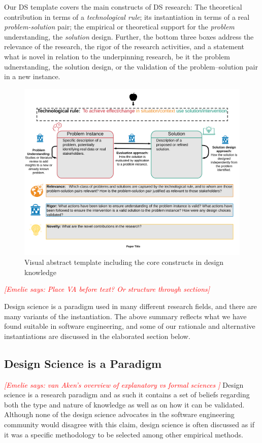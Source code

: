 \documentclass[graybox]{svmult}
\newcommand{\emelie}[1]{\textcolor{red}{{\it [Emelie says: #1]}}}
\newcommand{\emelie}[1]{}
\begin{document}
Our DS template covers the main constructs of DS research: The theoretical contribution in terms of a \emph{technological rule}; its instantiation in terms of a real \emph{problem-solution} pair;  the empirical or theoretical support for the \emph{problem} understanding, the \emph{solution} design. Further, the bottom three boxes address the relevance of the research, the rigor of the research activities, and a statement what is novel in relation to the underpinning research, be it the problem udnerstanding, the solution design, or the validation of the problem--solution pair in a new instance.
\begin{figure}
  \includegraphics[width=1.0\textwidth]{Figures/GenericVA.png}
\caption{Visual abstract template including the core constructs in design knowledge}
\label{fig:VA-template}       %
\end{figure}

\emelie{Place VA before text? Or structure through sections}

Design science is a paradigm used in many different research fields, and there are many variants of the instantiation. The above summary reflects what we have found suitable in software engineering, and some of our rationale and alternative instantiations are discussed in the elaborated section below.


\subsection{Design Science is a Paradigm}
\emelie{van Aken's overview of explanatory vs formal sciences \cite{van_aken_management_2004,van_aken_management_2005}}
Design science is a research paradigm and as such it contains a set of beliefs regarding both the type and nature of knowledge as well as on how it can be validated. Although none of the design science advocates in the software engineering community would disagree with this claim, design science is often discussed as if it was a specific methodology to be selected among other empirical methods. 
\end{document}
